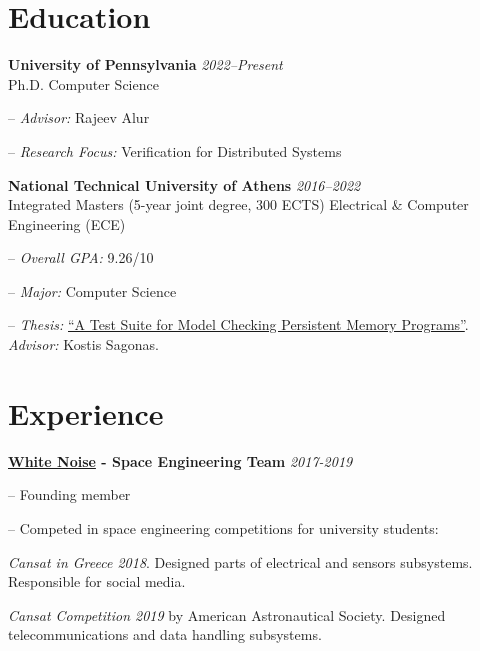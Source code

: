 \documentclass[margin]{res}
\newcommand{\field}[2]{\noindent \textbf{#1} \hfill #2 \\}
\begin{document}
\begin{resume}

\section{Education}

\field{University of Pennsylvania}  {\emph{2022--Present}} 
Ph.D. Computer Science
\begin{compactitem}
\item[--] \emph{Advisor:} Rajeev Alur
\item[--] \emph{Research Focus:} Verification for Distributed Systems
\end{compactitem}
 
\field{National Technical University of Athens}  {\emph{2016--2022}} 
Integrated Masters (5-year joint degree, 300 ECTS) Electrical \& Computer Engineering (ECE)
\begin{compactitem}
\item[--] \emph{Overall GPA:} 9.26/10 
\item[--] \emph{Major:} Computer Science 
\item[--] \emph{Thesis:} \href{http://artemis.cslab.ece.ntua.gr:8080/jspui/bitstream/123456789/18415/1/thesis.pdf}{``A Test Suite for Model Checking Persistent Memory Programs''}. \\
\emph{Advisor:} Kostis Sagonas.
\end{compactitem} 

\section{Experience}

\textbf{\href{https://whitenoise.gr/}{White Noise} - Space Engineering Team} \hfill \emph{2017-2019}
\begin{compactitem}
\item[--] Founding member
\item[--] Competed in space engineering competitions for university students:
\begin{compactitem}
\item \textit{Cansat in Greece 2018}. 
  Designed parts of electrical and sensors subsystems. 
  Responsible for social media.
\item \textit{Cansat Competition 2019} by American Astronautical Society. 
  Designed telecommunications and data handling subsystems.
\end{compactitem}
\end{compactitem}


\end{resume}
\end{document}
